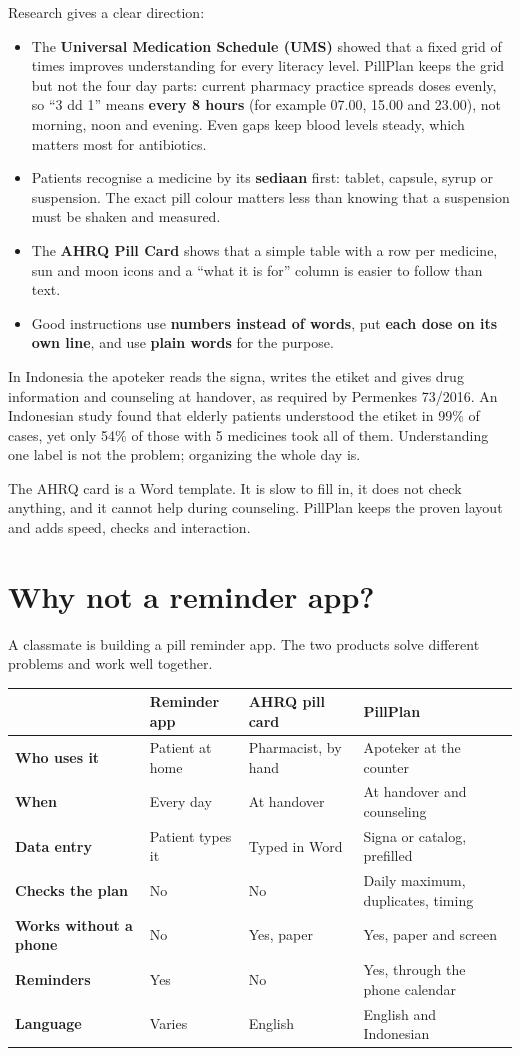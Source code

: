 \documentclass[11pt]{article}
\begin{document}
Research gives a clear direction:
\begin{itemize}
  \item The \textbf{Universal Medication Schedule (UMS)} showed that a fixed grid of times improves understanding for every literacy level. PillPlan keeps the grid but not the four day parts: current pharmacy practice spreads doses evenly, so ``3 dd 1'' means \textbf{every 8 hours} (for example 07.00, 15.00 and 23.00), not morning, noon and evening. Even gaps keep blood levels steady, which matters most for antibiotics.
  \item Patients recognise a medicine by its \textbf{sediaan} first: tablet, capsule, syrup or suspension. The exact pill colour matters less than knowing that a suspension must be shaken and measured.
  \item The \textbf{AHRQ Pill Card} shows that a simple table with a row per medicine, sun and moon icons and a ``what it is for'' column is easier to follow than text.
  \item Good instructions use \textbf{numbers instead of words}, put \textbf{each dose on its own line}, and use \textbf{plain words} for the purpose.
\end{itemize}

In Indonesia the apoteker reads the signa, writes the etiket and gives drug information and counseling at handover, as required by Permenkes 73/2016. An Indonesian study found that elderly patients understood the etiket in 99\% of cases, yet only 54\% of those with 5 medicines took all of them. Understanding one label is not the problem; organizing the whole day is.

The AHRQ card is a Word template. It is slow to fill in, it does not check anything, and it cannot help during counseling. PillPlan keeps the proven layout and adds speed, checks and interaction.

\section{Why not a reminder app?}
A classmate is building a pill reminder app. The two products solve different problems and work well together.

\begin{tabularx}{\linewidth}{@{}>{\bfseries}p{30mm}XXX@{}}
\toprule
 & Reminder app & AHRQ pill card & PillPlan \\
\midrule
Who uses it & Patient at home & Pharmacist, by hand & Apoteker at the counter \\
When & Every day & At handover & At handover and counseling \\
Data entry & Patient types it & Typed in Word & Signa or catalog, prefilled \\
Checks the plan & No & No & Daily maximum, duplicates, timing \\
Works without a phone & No & Yes, paper & Yes, paper and screen \\
Reminders & Yes & No & Yes, through the phone calendar \\
Language & Varies & English & English and Indonesian \\
\bottomrule
\end{tabularx}
\end{document}
